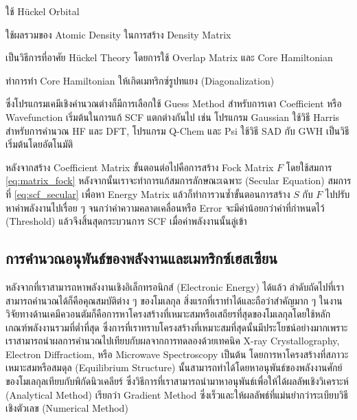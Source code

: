 \begin{description}[style=nextline]
    \item[Huckel guess] ใช้ H{\"u}ckel Orbital
    \item[Superposition of Atomic Densities (SAD)] ใช้ผลรวมของ Atomic Density ในการสร้าง Density Matrix
    \item[Generalized Wolfsberg-Helmholtz (GWH)] เป็นวิธีการที่อาศัย H{\"u}ckel Theory โดยการใช้ Overlap Matrix และ Core Hamiltonian
    \item[CORE] ทำการทำ Core Hamiltonian ให้เกิดเมทริกซ์รูปทแยง (Diagonalization)
\end{description}

ซึ่งโปรแกรมเคมีเชิงคำนวณต่างก็มีการเลือกใช้ Guess Method สำหรับการเดา Coefficient หรือ Wavefunction เริ่มต้นในการแก้ SCF แตกต่างกันไป
เช่น โปรแกรม Gaussian ใช้วิธี Harris สำหรับการคำนวณ HF และ DFT, โปรแกรม Q-Chem และ Psi ใช้วิธี SAD กับ GWH เป็นวิธีเริ่มต้นโดยอัตโนมัติ

หลังจากสร้าง Coefficient Matrix ขั้นตอนต่อไปคือการสร้าง Fock Matrix $F$ โดยใช้สมการ \ref{eq:matrix_fock} 
หลังจากนั้นเราจะทำการแก้สมการลักษณะเฉพาะ (Secular Equation) สมการที่ \ref{eq:scf_secular} เพื่อหา Energy Matrix 
แล้วก็ทำการวนซ้ำขั้นตอนการสร้าง $S$ กับ $F$ ไปปรับหาค่าพลังงานไปเรื่อย ๆ จนกว่าค่าความคลาดเคลื่อนหรือ Error จะมีค่าน้อยกว่าค่าที่กำหนดไว้ (Threshold)
แล้วจึงสิ้นสุดกระบวนการ SCF เมื่อค่าพลังงานนั้นลู่เข้า

\subsection{การคำนวณอนุพันธ์ของพลังงานและเมทริกซ์เฮสเซียน}

หลังจากที่เราสามารถหาพลังงานเชิงอิเล็กทรอนิกส์ (Electronic Energy) ได้แล้ว ลำดับถัดไปที่เราสามารถคำนวณได้ก็คือคุณสมบัติต่าง ๆ ของโมเลกุล
สิ่งแรกที่เราทำได้และถือว่าสำคัญมาก ๆ ในงานวิจัยทางด้านเคมีควอนตัมก็คือการหาโครงสร้างที่เหมาะสมหรือเสถียรที่สุดของโมเลกุลโดยใช้หลักเกณฑ์พลังงานรวมที่ต่ำที่สุด
ซึ่งการที่เราทราบโครงสร้างที่เหมาะสมที่สุดนั้นมีประโยชน์อย่างมากเพราะเราสามารถนำผลการคำนวณไปเทียบกับผลจากการทดลองด้วยเทคนิค X-ray Crystallography,
Electron Diffractiom, หรือ Microwave Spectroscopy เป็นต้น โดยการหาโครงสร้างที่สภาวะเหมาะสมหรือสมดุล (Equilibrium Structure) 
นั้นสามารถทำได้โดยหาอนุพันธ์ของพลังงานศักย์ของโมเลกุลเทียบกับพิกัดนิวเคลียร์ ซึ่งวิธีการที่เราสามารถนำมาหาอนุพันธ์เพื่อให้ได้ผลลัพเชิงวิเคราะห์ (Analytical Method) 
เรียกว่า Gradient Method ซึ่งเร็วและให้ผลลัพธ์ที่แม่นยำกว่าระเบียบวิธีเชิงตัวเลข (Numerical Method)


